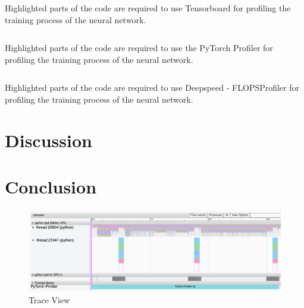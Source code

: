 \documentclass[12pt, a4paper, hidelinks]{article}
\begin{document}
\begin{listing}[H]
\inputminted[xleftmargin=1em,linenos,fontsize=\small, highlightlines={1,3,9-12,14-16}]{python}{./assets/tensorboard.py}
\caption[Code example for Tensorboard]{Highlighted parts of the code are required to use Tensorboard for profiling the training process of the neural network.}
\label{lst:tensorboard}
\end{listing}

\begin{listing}[H]
\inputminted[breaklines, xleftmargin=1em,linenos,fontsize=\small, highlightlines={4-10,14,15}]{python}{./assets/profiler-torch.py}
\caption[Code example for PyTorch - Profiler]{Highlighted parts of the code are required to use the PyTorch Profiler for profiling the training process of the neural network.}
\label{lst:profiler-torch}
\end{listing}

\begin{listing}[H]
\inputminted[xleftmargin=1em,linenos,fontsize=\small, highlightlines={1,3,4,8,9,11-18}]{python}{./assets/deepspeed.py}
\caption[Code example for Deepspeed - FLOPSProfiler]{Highlighted parts of the code are required to use Deepspeed - FLOPSProfiler for profiling the training process of the neural network.}
\label{lst:deepspeed}
\end{listing}


\section{Discussion}
\label{sec:discussion}



\section{Conclusion}
\label{sec:conclusion}




\newpage
\printbibliography[heading=bibintoc]

\appendix
\break

\renewcommand*{\thepage}{A\arabic{page}}

\begin{figure}[H]
\centering
\includegraphics[width=1\textwidth]{./assets/scap_gtx1080_profiler-torch_batch-size-64_14650758_trace-view}
\caption*{Trace View}
\label{fig:scap_gtx1080_profiler-torch_batch-size-64_14650758_trace-view}
\end{figure}
\end{document}
